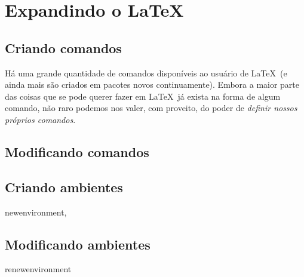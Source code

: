 \section{Expandindo o \LaTeX}

\subsection{Criando comandos}

\label{sec:comandos}

Há uma grande quantidade de comandos disponíveis ao usuário de
\LaTeX\ (e ainda mais são criados em pacotes novos
continuamente). Embora a maior parte das coisas que se pode querer
fazer em \LaTeX\ já exista na forma de algum comando, não raro podemos
nos valer, com proveito, do poder de \emph{definir nossos
  próprios comandos}. 




\subsection{Modificando comandos}

\subsection{Criando ambientes}

newenvironment, 

\subsection{Modificando ambientes}
renewenvironment
